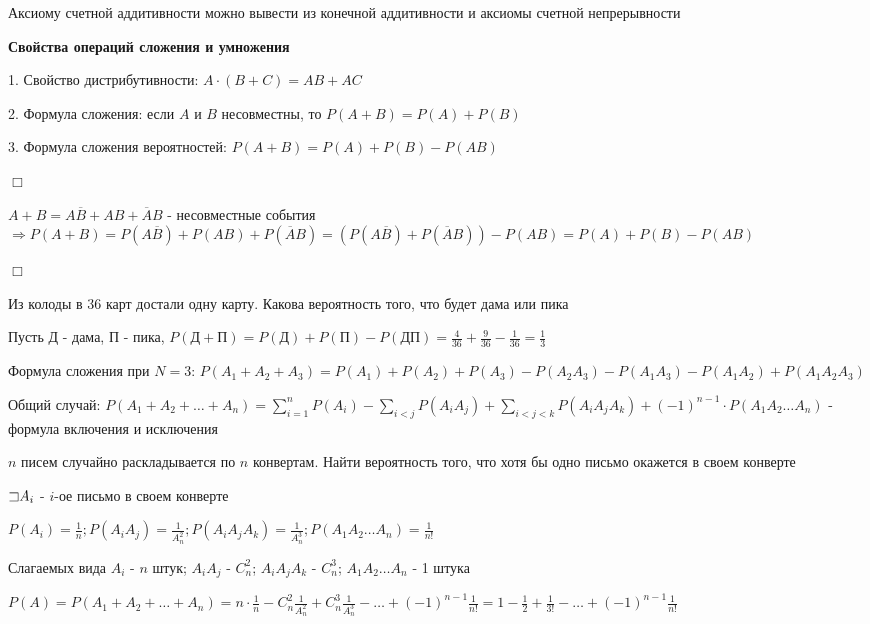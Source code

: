 \documentclass[12pt]{article}
\begin{document}
    \Nota Аксиому счетной аддитивности можно вывести из конечной аддитивности и аксиомы счетной непрерывности

    \hypertarget{probabilityoperationsproperties}{}

    \textbf{Свойства операций сложения и умножения}

    1. Свойство дистрибутивности: $A \cdot (B + C) = AB + AC$

    2. Формула сложения: если $A$ и $B$ несовместны, то $P(A + B) = P(A) + P(B)$

    3. Формула сложения вероятностей: $P(A + B) = P(A) + P(B) - P(AB)$

    \begin{tcolorbox}
        $\Box$

        $A + B = A\overline{B} + AB + \overline{A}B$ - несовместные события $\Longrightarrow P(A + B) = P(A\overline{B}) + P(AB) + P(\overline{A}B) =
        (P(A\overline{B}) + P(\overline{A}B)) - P(AB) = P(A) + P(B) - P(AB)$

        $\Box$
    \end{tcolorbox}

    \Ex Из колоды в 36 карт достали одну карту. Какова вероятность того, что будет дама или пика

    Пусть Д - дама, П - пика, $P(\text{Д} + \text{П}) = P(\text{Д}) + P(\text{П}) - P(\text{Д}\text{П}) = \frac{4}{36} + \frac{9}{36} - \frac{1}{36} = \frac{1}{3}$

    Формула сложения при $N = 3$: $P(A_1 + A_2 + A_3) = P(A_1) + P(A_2) + P(A_3) - P(A_2 A_3) - P(A_1 A_3) - P(A_1 A_2) + P(A_1 A_2 A_3)$

    Общий случай: $P(A_1 + A_2 + \dots + A_n) =  \sum_{i = 1}^n P(A_i) - \sum_{i < j} P(A_i A_j) + \sum_{i < j < k} P(A_i A_j A_k) + (-1)^{n - 1} \cdot P(A_1 A_2 \dots A_n)$ - формула включения и исключения

    \Ex $n$ писем случайно раскладывается по $n$ конвертам. Найти вероятность того, что хотя бы одно письмо окажется в своем конверте

    $\mathord{\sqsupset} A_i$ - $i$-ое письмо в своем конверте

    $P(A_i) = \frac{1}{n}; P(A_i A_j) = \frac{1}{A^2_n}; P(A_i A_j A_k) = \frac{1}{A^3_n}; P(A_1 A_2 \dots A_n) = \frac{1}{n!}$

    Слагаемых вида $A_i$ - $n$ штук; $A_i A_j$ - $C^2_n$; $A_i A_j A_k$ - $C^3_n$; $A_1 A_2 \dots A_n$ - 1 штука

    $P(A) = P(A_1 + A_2 + \dots + A_n) = n \cdot \frac{1}{n} - C^2_n \frac{1}{A^2_n} + C^3_n \frac{1}{A^3_n} - \dots + (-1)^{n - 1} \frac{1}{n!} = 1 - \frac{1}{2} + \frac{1}{3!} - \dots + (-1)^{n - 1} \frac{1}{n!}$
\end{document}
